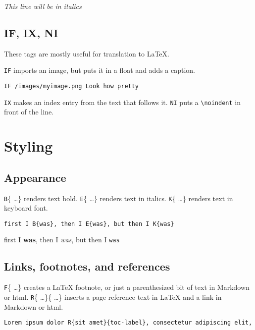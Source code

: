 \emph{This line will be in italics}

\section{IF, IX, NI}
\label{if-ix-ni}

These tags are mostly useful for translation to \LaTeX{}.


\texttt{IF} imports an image, but puts it in a float and adds a caption.

\begin{verbatim}
IF /images/myimage.png Look how pretty
\end{verbatim}

\texttt{IX} makes an index entry from the text that follows it. \texttt{NI} puts a \texttt{\textbackslash noindent} in front of the line.

\chapter{Styling}
\label{styling}
\section{Appearance}
\label{appearance}

\texttt{B}\{ \ldots  \} renders text bold. \texttt{E}\{ \ldots  \} renders text in italics. \texttt{K}\{ \ldots  \} renders text in keyboard font.

\begin{verbatim}
first I B{was}, then I E{was}, but then I K{was}
\end{verbatim}

first I \textbf{was}, then I \emph{was}, but then I \texttt{was}

\section{Links, footnotes, and references}
\label{links-footnotes-and-references}

\texttt{F}\{ \ldots  \} creates a \LaTeX{} footnote, or just a parenthesized bit of text in Markdown or html. \texttt{R}\{ \ldots  \}\{ \ldots  \} inserts a page reference text in \LaTeX{} and a link in Markdown or html.

\begin{verbatim}
Lorem ipsum dolor R{sit amet}{toc-label}, consectetur adipiscing elit,
\end{verbatim}

